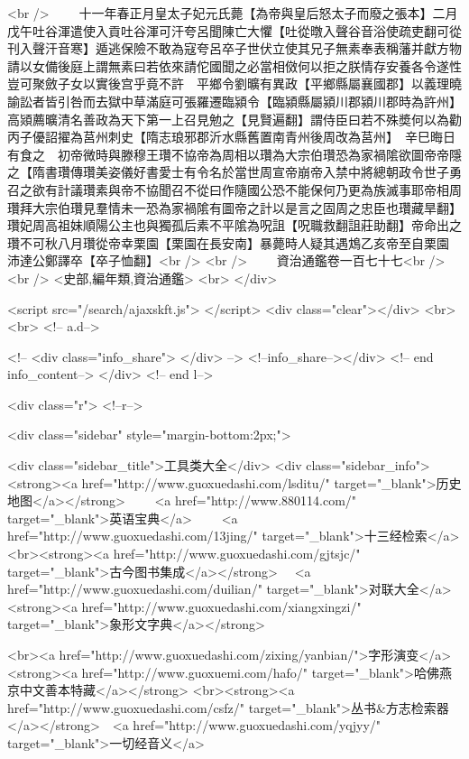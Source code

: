 <br />
　　十一年春正月皇太子妃元氏薨【為帝與皇后怒太子而廢之張本】二月戊午吐谷渾遣使入貢吐谷渾可汗夸呂聞陳亡大懼【吐從暾入聲谷音浴使疏吏翻可從刊入聲汗音寒】遁逃保險不敢為寇夸呂卒子世伏立使其兄子無素奉表稱藩并獻方物請以女備後庭上謂無素曰若依來請佗國聞之必當相傚何以拒之朕情存安養各令遂性豈可聚斂子女以實後宫乎竟不許　平鄉令劉曠有異政【平鄉縣屬襄國郡】以義理曉諭訟者皆引咎而去獄中草滿庭可張羅遷臨潁令【臨潁縣屬潁川郡潁川郡時為許州】高熲薦曠清名善政為天下第一上召見勉之【見賢遍翻】謂侍臣曰若不殊奬何以為勸丙子優詔擢為莒州刺史【隋志琅邪郡沂水縣舊置南青州後周改為莒州】　辛巳晦日有食之　初帝微時與滕穆王瓚不協帝為周相以瓚為大宗伯瓚恐為家禍隂欲圖帝帝隱之【隋書瓚傳瓚美姿儀好書愛士有令名於當世周宣帝崩帝入禁中將總朝政令世子勇召之欲有計議瓚素與帝不協聞召不從曰作隨國公恐不能保何乃更為族滅事耶帝相周瓚拜大宗伯瓚見羣情未一恐為家禍隂有圖帝之計以是言之固周之忠臣也瓚藏旱翻】瓚妃周高祖妹順陽公主也與獨孤后素不平隂為呪詛【呪職救翻詛莊助翻】帝命出之瓚不可秋八月瓚從帝幸栗園【栗園在長安南】暴薨時人疑其遇鴆乙亥帝至自栗園　沛達公鄭譯卒【卒子恤翻】<br />
<br />
　　資治通鑑卷一百七十七<br />
<br />
<史部,編年類,資治通鑑>  <br>
   </div> 

<script src="/search/ajaxskft.js"> </script>
 <div class="clear"></div>
<br>
<br>
 <!-- a.d-->

 <!--
<div class="info_share">
</div> 
-->
 <!--info_share--></div>   <!-- end info_content-->
  </div> <!-- end l-->

<div class="r">   <!--r-->



<div class="sidebar"  style="margin-bottom:2px;">

 
<div class="sidebar_title">工具类大全</div>
<div class="sidebar_info">
<strong><a href="http://www.guoxuedashi.com/lsditu/" target="_blank">历史地图</a></strong>　　
<a href="http://www.880114.com/" target="_blank">英语宝典</a>　　
<a href="http://www.guoxuedashi.com/13jing/" target="_blank">十三经检索</a>　
<br><strong><a href="http://www.guoxuedashi.com/gjtsjc/" target="_blank">古今图书集成</a></strong>　
<a href="http://www.guoxuedashi.com/duilian/" target="_blank">对联大全</a>　<strong><a href="http://www.guoxuedashi.com/xiangxingzi/" target="_blank">象形文字典</a></strong>　

<br><a href="http://www.guoxuedashi.com/zixing/yanbian/">字形演变</a>　　<strong><a href="http://www.guoxuemi.com/hafo/" target="_blank">哈佛燕京中文善本特藏</a></strong>
<br><strong><a href="http://www.guoxuedashi.com/csfz/" target="_blank">丛书&方志检索器</a></strong>　<a href="http://www.guoxuedashi.com/yqjyy/" target="_blank">一切经音义</a>　　

